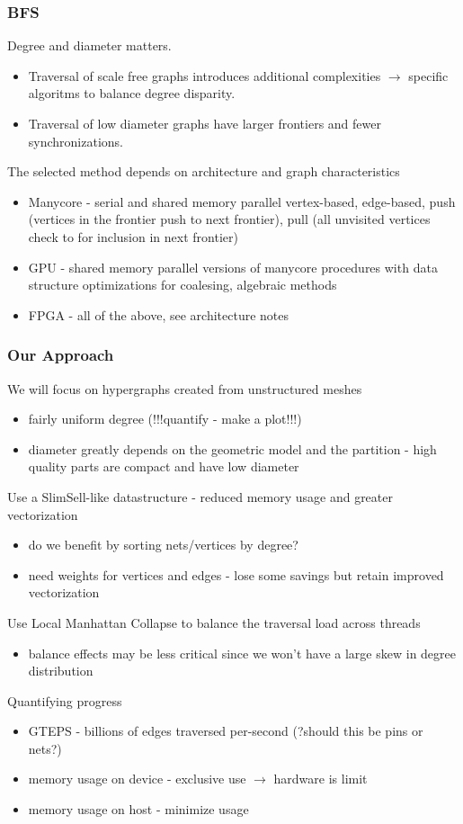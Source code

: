 \documentclass{beamer}
\begin{document}
\begin{frame}
  \frametitle{BFS}
  Degree and diameter matters.
  \begin{itemize}
    \item Traversal of scale free graphs introduces additional
      complexities $\rightarrow$ specific algoritms to balance degree disparity.
    \item Traversal of low diameter graphs have larger frontiers and fewer
      synchronizations.
  \end{itemize}
  The selected method depends on architecture and graph characteristics
  \begin{itemize}
    \item Manycore - serial and shared memory parallel vertex-based, edge-based, push (vertices
      in the frontier push to next frontier), pull (all unvisited vertices check
      to for inclusion in next frontier)
    \item GPU - shared memory parallel versions of manycore procedures with data structure
      optimizations for coalesing, algebraic methods
    \item FPGA - all of the above, see architecture notes
  \end{itemize}
\end{frame}

\begin{frame}
  \frametitle{Our Approach}
  We will focus on hypergraphs created from unstructured meshes
  \begin{itemize}
    \item fairly uniform degree (!!!quantify - make a plot!!!)
    \item diameter greatly depends on the geometric model and the
      partition - high quality parts are compact and have low diameter
  \end{itemize}
  Use a SlimSell-like datastructure - reduced memory usage and greater
  vectorization 
  \begin{itemize}
    \item do we benefit by sorting nets/vertices by degree?
    \item need weights for vertices and edges - lose some savings but retain
      improved vectorization
  \end{itemize}
  Use Local Manhattan Collapse to balance the traversal load across threads
  \begin{itemize}
    \item balance effects may be less critical since
      we won't have a large skew in degree distribution
  \end{itemize}
  Quantifying progress
  \begin{itemize}
    \item GTEPS - billions of edges traversed per-second (?should this be pins
      or nets?)
    \item memory usage on device - exclusive use $\rightarrow$ hardware is limit
    \item memory usage on host - minimize usage
  \end{itemize}
\end{frame}
\end{document}
